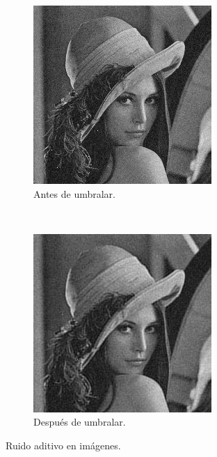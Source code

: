 \documentclass[a4paper,10pt,twoside]{article}
\begin{document}
\begin{figure}[H]
  \centering
  \begin{subfigure}[b]{0.45\textwidth}
    \centering
    \includegraphics[width=\textwidth]{graficos/lena_aditivo_muestra.png}    
    \caption{Antes de umbralar.}
  \end{subfigure}
  ~ 
  \begin{subfigure}[b]{0.45\textwidth}
    \centering
    \includegraphics[width=\textwidth]{graficos/lena_aditivo_umbralizar_muestra.png}
    \caption{Después de umbralar.}
  \end{subfigure}
  \caption{Ruido aditivo en imágenes.}
\end{figure}
\end{document}
